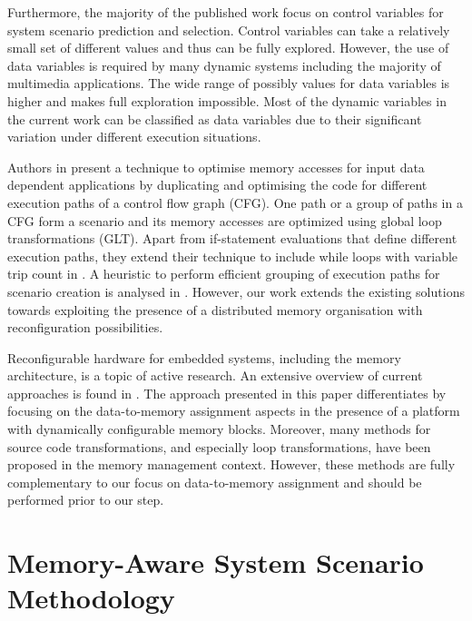 \documentclass[a4paper,conference]{IEEEtran}
\begin{document}
Furthermore, the majority of the published work focus on control variables for system scenario prediction and selection. Control variables can take a relatively small set of different values and thus can be fully explored. However, the use of data variables \cite{Elena2010} is required by many dynamic systems including the majority of multimedia applications. The wide range of possibly values for data variables is higher and makes full exploration impossible. Most of the dynamic variables in the current work can be classified as data variables due to their significant variation under different execution situations. 

Authors in \cite{Pal06} present a technique to optimise memory accesses for input data dependent applications by duplicating and optimising the code for different execution paths of a control flow graph (CFG). One path or a group of paths in a CFG form a scenario and its memory accesses are optimized using global loop transformations (GLT). Apart from if-statement evaluations that define different execution paths, they extend their technique to include while loops with variable trip count in \cite{Pal06b}. A heuristic to perform efficient grouping of execution paths for scenario creation is analysed in \cite{Pal07}. However, our work extends the existing solutions towards exploiting the presence of a distributed memory organisation with reconfiguration possibilities.

Reconfigurable hardware for embedded systems, including the memory architecture, is a topic of active research. An extensive overview of current approaches is found in \cite{Garcia}. The approach presented in this paper differentiates by focusing on the data-to-memory assignment aspects in the presence of a platform with dynamically configurable memory blocks. Moreover, many methods for source code transformations, and especially loop transformations, have been proposed in the memory management context. However, these methods are fully complementary to our focus on data-to-memory assignment and should be performed prior to our step. 

\section{Memory-Aware System Scenario Methodology}
\label{sec:methodology}
\end{document}
